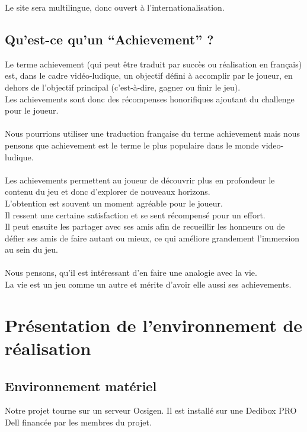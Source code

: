 \documentclass{life-fr}
\begin{document}
Le site sera multilingue, donc ouvert à l'internationalisation.

\section{Qu'est-ce qu'un ``Achievement'' ?}
Le terme achievement (qui peut être traduit par succès ou réalisation en français) est, dans le cadre vidéo-ludique,  un objectif défini à accomplir par le joueur, en dehors de l’objectif principal (c’est-à-dire, gagner ou finir le jeu).\\
 Les achievements sont donc des récompenses honorifiques ajoutant du challenge pour le joueur.\\
\\
Nous pourrions utiliser une traduction française du terme achievement mais nous pensons que achievement est le terme le plus populaire dans le monde video-ludique.\\
\\
Les achievements permettent au joueur de découvrir plus en profondeur le contenu du jeu et donc d’explorer de nouveaux horizons.\\
 L’obtention est souvent un moment agréable pour le joueur.\\
 Il ressent une certaine satisfaction et se sent récompensé pour un effort.\\
 Il peut ensuite les partager avec ses amis afin de recueillir les honneurs ou de défier ses amis de faire autant ou mieux, ce qui améliore grandement l’immersion au sein du jeu.\\
\\
Nous pensons, qu’il est intéressant d’en faire une analogie avec la vie.\\
 La vie est un jeu comme un autre et mérite d’avoir elle aussi ses achievements.\\

\newpage
\hspace{2cm}
\newpage


\chapter{Présentation de l’environnement de réalisation}

\section{Environnement matériel}

Notre projet tourne sur un serveur Ocsigen. Il est installé sur une Dedibox PRO Dell financée par les membres du projet.
\end{document}
